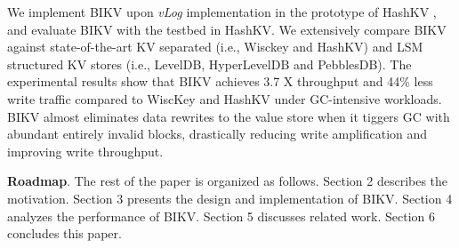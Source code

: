 \documentclass[sigconf]{acmart}
\begin{document}

We implement BIKV upon \textit{vLog} implementation in the prototype of HashKV \cite{HashKV}, and evaluate BIKV with the testbed in HashKV. We extensively compare BIKV against state-of-the-art KV separated (i.e., Wisckey and HashKV) and LSM structured KV stores (i.e., LevelDB, HyperLevelDB and PebblesDB). The experimental results show that BIKV achieves 3.7 X throughput and 44\% less write traffic compared to WiscKey and HashKV under GC-intensive workloads. BIKV almost eliminates data rewrites to the value store when it tiggers GC with abundant entirely invalid blocks, drastically reducing write amplification and improving write throughput.


\textbf{Roadmap}. The rest of the paper is organized as follows. Section 2 describes the motivation. Section 3 presents the design and implementation of BIKV. Section 4 analyzes the performance of BIKV. Section 5 discusses related work. Section 6 concludes this paper.
\end{document}
